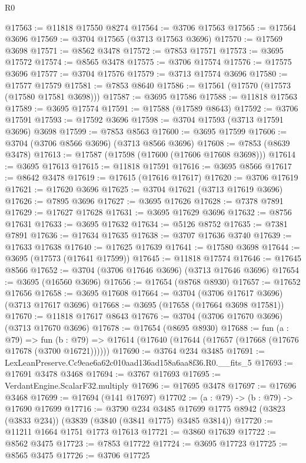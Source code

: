 \begin{lexlean}{R0}
\begin{coremodule}
@17563 := @11818 @17550 @8274
@17564 := @3706 @17563
@17565 := @17564 @3696
@17569 := @3704 @17565 (@3713 @17563 @3696)
@17570 := @17569 @3698
@17571 := @8562 @3478
@17572 := @7853 @17571
@17573 := @3695 @17572
@17574 := @8565 @3478
@17575 := @3706 @17574
@17576 := @17575 @3696
@17577 := @3704 @17576
@17579 := @3713 @17574 @3696
@17580 := @17577 @17579
@17581 := @7853 @8640
@17586 := @17561 (@17570 (@17573 (@17580 @17581 @3698)))
@17587 := @3695 @17586
@17588 := @11818 @17563
@17589 := @3695 @17574
@17591 := @17588 (@17589 @8643)
@17592 := @3706 @17591
@17593 := @17592 @3696
@17598 := @3704 @17593 (@3713 @17591 @3696) @3698
@17599 := @7853 @8563
@17600 := @3695 @17599
@17606 := @3704 (@3706 @8566 @3696) (@3713 @8566 @3696)
@17608 := @7853 (@8639 @3478)
@17613 := @17587 (@17598 (@17600 (@17606 @17608 @3698)))
@17614 := @3695 @17613
@17615 := @11818 @17591
@17616 := @3695 @8566
@17617 := @8642 @3478
@17619 := @17615 (@17616 @17617)
@17620 := @3706 @17619
@17621 := @17620 @3696
@17625 := @3704 @17621 (@3713 @17619 @3696)
@17626 := @7895 @3696
@17627 := @3695 @17626
@17628 := @7378 @7891
@17629 := @17627 @17628
@17631 := @3695 @17629 @3696
@17632 := @8756 @17631
@17633 := @3695 @17632
@17634 := @5126 @8752
@17635 := @7381 @7891
@17636 := @17634 @17635
@17638 := @3707 @17636 @3740
@17639 := @17633 @17638
@17640 := @17625 @17639
@17641 := @17580 @3698
@17644 := @3695 (@17573 (@17641 @17599))
@17645 := @11818 @17574
@17646 := @17645 @8566
@17652 := @3704 (@3706 @17646 @3696) (@3713 @17646 @3696)
@17654 := @3695 (@16560 @3696)
@17656 := @17654 (@8768 @8930)
@17657 := @17652 @17656
@17658 := @3695 @17608
@17664 := @3704 (@3706 @17617 @3696) (@3713 @17617 @3696)
@17668 := @3695 (@17658 (@17664 @3698 @17581))
@17670 := @11818 @17617 @8643
@17676 := @3704 (@3706 @17670 @3696) (@3713 @17670 @3696)
@17678 := @17654 (@8695 @8930)
@17688 := fun (a : @79) =>
  fun (b : @79) => @17614 (@17640 (@17644 (@17657 (@17668 (@17676 @17678 (@3700 @16721))))))
@17690 := @3764 @234 @3485
@17691 := LexLeanPreserve.Cc9eae6a62c010aad136ad158a6aa8f36.R0.__fits_5
@17693 := @17691 @3478 @3468
@17694 := @3767 @17693
@17695 := VerdantEngine.ScalarF32.multiply
@17696 := @17695 @3478
@17697 := @17696 @3468
@17699 := @17694 (@141 @17697)
@17702 := (a : @79) -> (b : @79) -> @17690 @17699
@17716 := @3790
    @234
    @3485
    @17699
    @1775
    @8942
    (@3823 (@3833 @234))
    (@3839 (@3840 (@3841 @1775) @3485 @3814))
@17720 := @11211 @1664 @1751 @1773 @17613
@17721 := @3860 @17639
@17722 := @8562 @3475
@17723 := @7853 @17722
@17724 := @3695 @17723
@17725 := @8565 @3475
@17726 := @3706 @17725

\end{coremodule}
\end{lexlean}
